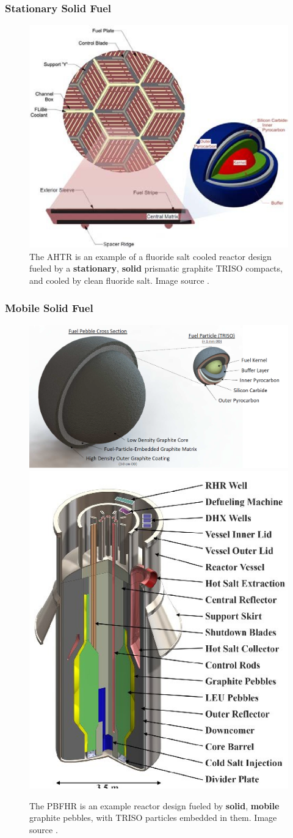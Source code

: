 \begin{frame}
        \frametitle{Stationary Solid Fuel}
               \begin{figure}[t]
                \vspace*{-0.1in}
			\hspace*{-0.35in}
                \includegraphics[height=0.5\textwidth]{./images/example-ahtr.png}
                       \caption{The \gls{AHTR} \cite{forsberg_fuel_2004} 
                       is an example of a fluoride salt cooled reactor 
                       design fueled by a \textbf{stationary}, \textbf{solid} 
                       prismatic graphite TRISO compacts, and cooled by clean fluoride salt.
                       Image source \cite{gentry_burnable_2015}. }
               \end{figure}            
\end{frame}

\begin{frame}
        \frametitle{Mobile Solid Fuel}
               \begin{figure}[t]
                \vspace*{-0.1in}
			\hspace*{-0.35in}
                \includegraphics[height=0.2\textwidth]{./images/example-pbfhr-fuel.png}
                \includegraphics[height=0.4\textwidth]{./images/example-pbfhr-core.jpg}
                       \caption{The \gls{PBFHR} is an example reactor design 
                       fueled by \textbf{solid}, \textbf{mobile} graphite 
                       pebbles, with TRISO particles embedded in them. Image 
                       source \cite{andreades_technical_2014}.}
               \end{figure}            
\end{frame}


